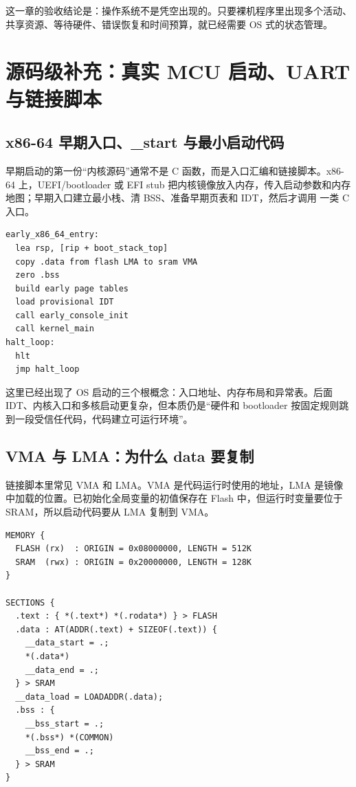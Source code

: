 这一章的验收结论是：操作系统不是凭空出现的。只要裸机程序里出现多个活动、共享资源、等待硬件、错误恢复和时间预算，就已经需要 OS 式的状态管理。

\section{源码级补充：真实 MCU 启动、UART 与链接脚本}

\subsection{x86-64 早期入口、\_start 与最小启动代码}

早期启动的第一份“内核源码”通常不是 C 函数，而是入口汇编和链接脚本。x86-64 上，UEFI/bootloader 或 EFI stub 把内核镜像放入内存，传入启动参数和内存地图；早期入口建立最小栈、清 BSS、准备早期页表和 IDT，然后才调用  一类 C 入口。

\begin{lstlisting}
early_x86_64_entry:
  lea rsp, [rip + boot_stack_top]
  copy .data from flash LMA to sram VMA
  zero .bss
  build early page tables
  load provisional IDT
  call early_console_init
  call kernel_main
halt_loop:
  hlt
  jmp halt_loop
\end{lstlisting}

这里已经出现了 OS 启动的三个根概念：入口地址、内存布局和异常表。后面 IDT、内核入口和多核启动更复杂，但本质仍是“硬件和 bootloader 按固定规则跳到一段受信任代码，代码建立可运行环境”。

\subsection{VMA 与 LMA：为什么 data 要复制}

链接脚本里常见 VMA 和 LMA。VMA 是代码运行时使用的地址，LMA 是镜像中加载的位置。已初始化全局变量的初值保存在 Flash 中，但运行时变量要位于 SRAM，所以启动代码要从 LMA 复制到 VMA。

\begin{lstlisting}
MEMORY {
  FLASH (rx)  : ORIGIN = 0x08000000, LENGTH = 512K
  SRAM  (rwx) : ORIGIN = 0x20000000, LENGTH = 128K
}

SECTIONS {
  .text : { *(.text*) *(.rodata*) } > FLASH
  .data : AT(ADDR(.text) + SIZEOF(.text)) {
    __data_start = .;
    *(.data*)
    __data_end = .;
  } > SRAM
  __data_load = LOADADDR(.data);
  .bss : {
    __bss_start = .;
    *(.bss*) *(COMMON)
    __bss_end = .;
  } > SRAM
}
\end{lstlisting}

